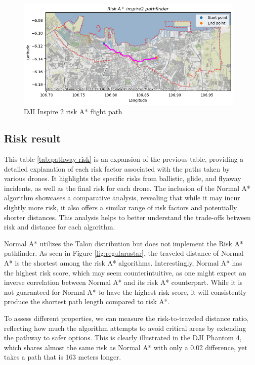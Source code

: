 \documentclass[12pt]{report}
\begin{document}
        \begin{figure}[H]
            \centering
            \includegraphics[width=\textwidth]{Plot/inspire/inspire_route.png}
            \caption{DJI Inspire 2 risk A* flight path}
        \end{figure}

        \subsection{Risk result}
        This table \ref{tab:pathway-risk} is an expansion of the previous table, providing a detailed
        explanation of each risk factor associated with the paths taken by various drones. It highlights the specific
        risks from ballistic, glide, and flyaway incidents, as well as the final risk for each drone. The inclusion of
        the Normal A* algorithm showcases a comparative analysis, revealing that while it may incur slightly more risk,
        it also offers a similar range of risk factors and potentially shorter distances. This analysis helps to better
        understand the trade-offs between risk and distance for each algorithm.
            
        Normal A* utilizes the Talon distribution but does not implement the Risk A* pathfinder. As seen in Figure
        \ref{fig:regularastar}, the traveled distance of Normal A* is the shortest among the risk A* algorithms.
        Interestingly, Normal A* has the highest risk score, which may seem counterintuitive, as one might expect an
        inverse correlation between Normal A* and its risk A* counterpart. While it is not guaranteed for Normal A* to
        have the highest risk score, it will consistently produce the shortest path length compared to risk A*.
            
        To assess different properties, we can measure the risk-to-traveled distance ratio, reflecting how much the
        algorithm attempts to avoid critical areas by extending the pathway to safer options. This is clearly
        illustrated in the DJI Phantom 4, which shares almost the same risk as Normal A* with only a 0.02 difference,
        yet takes a path that is 163 meters longer.
            
\end{document}
